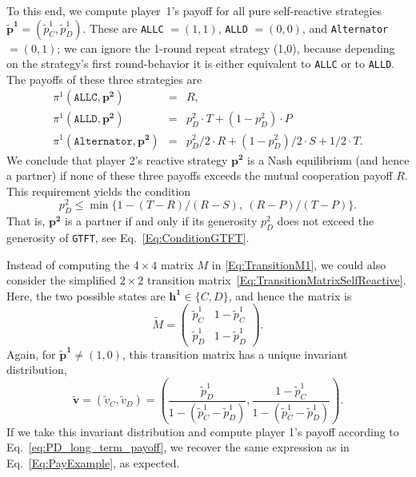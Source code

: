\documentclass[11pt]{article}
\theoremstyle{plainCl1}
\theoremstyle{plainCl2}
\def\gtft{\texttt{GTFT}}
\def\allc{\texttt{ALLC}}
\def\alld{\texttt{ALLD}}
\def\alt{\texttt{Alternator}}
\begin{document}
To this end, we compute player~1's payoff for all pure self-reactive strategies $\mathbf{\tilde p^1}\!=\!(\tilde p^1_C, \tilde p^1_D)$. 
These are \allc{} $=\! (1,1)$, \alld{} $=\!(0,0)$, and \alt{} $=\!(0,1)$; we can ignore the 1-round repeat strategy (1,0), because depending on the strategy's first round-behavior it is either equivalent to \allc{} or to \alld{}. The payoffs of these three strategies are
\begin{equation}
\begin{array}{rcl}
\pi^1(\allc,\mathbf{p^2}) &= &R,\\[0.2cm]
\pi^1(\alld,\mathbf{p^2}) &= &p^2_D \!\cdot \!T +(1\!-\!p^2_D) \!\cdot\!P\\[0.2cm]
\pi^1(\alt,\mathbf{p^2})	&=	& p^2_D/2\!\cdot\!R + (1\!-\!p^2_D)/2\!\cdot\!S + 1/2\!\cdot\! T.
\end{array}
\end{equation}
We conclude that player 2's reactive strategy $\mathbf{p^2}$ is a Nash equilibrium (and hence a partner) if none of these three payoffs exceeds the mutual cooperation payoff $R$. This requirement yields the condition
\begin{equation}
p^2_D \le \min\big\{1\!-\!(T\!-\!R)/(R\!-\!S),~(R\!-\!P)/(T\!-\!P)\big\}.
\end{equation}
That is, $\mathbf{p^2}$ is a partner if and only if its generosity $p^2_D$ does not exceed the generosity of \gtft, see Eq.~\eqref{Eq:ConditionGTFT}. 

Instead of computing the $4\times4$ matrix $M$ in \eqref{Eq:TransitionM1}, we could also consider the simplified $2\!\times\!2$ transition matrix~\eqref{Eq:TransitionMatrixSelfReactive}. Here, the two possible states are $\mathbf{h^1}\!\in\!\{C,D\}$, and hence the matrix is
\begin{equation}
\tilde{M} = \left(
\begin{array}{cc}
\tilde{p}^1_C	&1\!-\!\tilde p^1_C\\
\tilde p^1_D	&1\!-\!\tilde p^1_D
\end{array}
\right). 
\end{equation}
Again, for $\mathbf{\tilde p^1} \!\neq\! (1,0)$, this transition matrix has a unique invariant distribution,
\begin{equation}
\mathbf{\tilde v} = (\tilde v_C, \tilde v_D) = \left( \frac{\tilde p^1_D}{1-({\tilde p^1_C} - {\tilde p^1_D})}, \frac{1\!-\!\tilde p^1_C}{1-({\tilde p^1_C} - {\tilde p^1_D})} \right).
\end{equation}
If we take this invariant distribution and compute player 1's payoff according to Eq.~\eqref{eq:PD_long_term_payoff}, we recover the same expression as in Eq.~\eqref{Eq:PayExample}, as expected.
\end{document}
